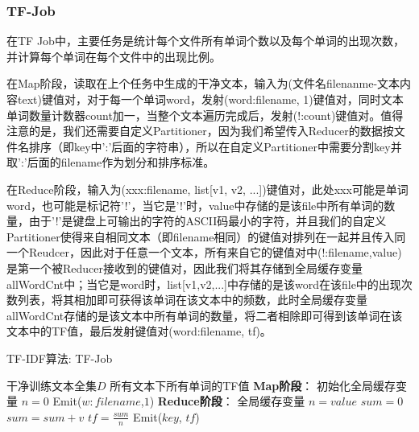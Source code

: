 \documentclass[lang=cn,11pt]{elegantpaper}
\begin{document}
\subsubsection{TF-Job}
在TF Job中，主要任务是统计每个文件所有单词个数以及每个单词的出现次数，并计算每个单词在每个文件中的出现比例。\par
在Map阶段，读取在上个任务中生成的干净文本，输入为(文件名filenanme-文本内容text)键值对，对于每一个单词word，发射(word:filename, 1)键值对，同时文本单词数量计数器count加一，当整个文本遍历完成后，发射(!:count)键值对。值得注意的是，我们还需要自定义Partitioner，因为我们希望传入Reducer的数据按文件名排序（即key中':'后面的字符串），所以在自定义Partitioner中需要分割key并取':'后面的filename作为划分和排序标准。\par
在Reduce阶段，输入为(xxx:filename, list[v1, v2, ...])键值对，此处xxx可能是单词word，也可能是标记符'!'，当它是'!'时，value中存储的是该file中所有单词的数量，由于'!'是键盘上可输出的字符的ASCII码最小的字符，并且我们的自定义Partitioner使得来自相同文本（即filename相同）的键值对排列在一起并且传入同一个Reudcer，因此对于任意一个文本，所有来自它的键值对中(!:filename,value)是第一个被Reducer接收到的键值对，因此我们将其存储到全局缓存变量allWordCnt中；当它是word时，list[v1,v2,...]中存储的是该word在该file中的出现次数列表，将其相加即可获得该单词在该文本中的频数，此时全局缓存变量allWordCnt存储的是该文本中所有单词的数量，将二者相除即可得到该单词在该文本中的TF值，最后发射键值对(word:filename, tf)。\par
\begin{algorithm}[!htb]  
  \caption{TF-IDF算法: TF-Job}  
  \label{alg:Framwork}
  \begin{algorithmic}[1]
    \Require
    干净训练文本全集$D$
    \Ensure
    所有文本下所有单词的TF值
    \State \textbf{Map阶段}：
    \State 初始化全局缓存变量 $n=0$
    \EndFunction
        \State Emit($w:filename$,$1$)
      \EndFor
    \EndFunction
    \State \textbf{Reduce阶段}：
      \State 全局缓存变量 $n=value$
    \Else
      \State $sum=0$
        \State $sum = sum + v$
      \EndFor
      \State $tf = \frac{sum}{n}$
      \State Emit($key$, $tf$)
    \EndIf
    \EndFunction
  \end{algorithmic}
\end{algorithm}
\end{document}
